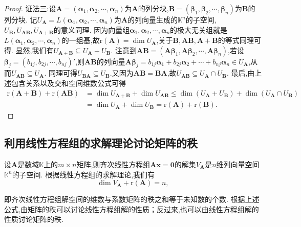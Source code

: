 \documentclass[lang=cn,newtx,10pt,scheme=chinese]{elegantbook}
\begin{document}
\begin{proof}
{\color{blue}证法三:}设\(\boldsymbol{A}=(\boldsymbol{\alpha}_1,\boldsymbol{\alpha}_2,\cdots,\boldsymbol{\alpha}_n)\)为\(\boldsymbol{A}\)的列分块,\(\boldsymbol{B}=(\boldsymbol{\beta}_1,\boldsymbol{\beta}_2,\cdots,\boldsymbol{\beta}_n)\)为\(\boldsymbol{B}\)的列分块. 记\(U_{\boldsymbol{A}} = L(\boldsymbol{\alpha}_1,\boldsymbol{\alpha}_2,\cdots,\boldsymbol{\alpha}_n)\)为\(\boldsymbol{A}\)的列向量生成的\(\mathbb{K}^n\)的子空间,\(U_{\boldsymbol{B}},U_{\boldsymbol{A}\boldsymbol{B}},U_{\boldsymbol{A}+\boldsymbol{B}}\)的意义同理. 因为向量组\(\boldsymbol{\alpha}_1,\boldsymbol{\alpha}_2,\cdots,\boldsymbol{\alpha}_n\)的极大无关组就是\(L(\boldsymbol{\alpha}_1,\boldsymbol{\alpha}_2,\cdots,\boldsymbol{\alpha}_n)\)的一组基,故\(\mathrm{r}(\boldsymbol{A})=\dim U_{\boldsymbol{A}}\),关于\(\boldsymbol{B},\boldsymbol{A}\boldsymbol{B},\boldsymbol{A}+\boldsymbol{B}\)的等式同理可得. 显然,我们有\(U_{\boldsymbol{A}+\boldsymbol{B}}\subseteq U_{\boldsymbol{A}}+U_{\boldsymbol{B}}\). 注意到\(\boldsymbol{A}\boldsymbol{B}=(\boldsymbol{A}\boldsymbol{\beta}_1,\boldsymbol{A}\boldsymbol{\beta}_2,\cdots,\boldsymbol{A}\boldsymbol{\beta}_n)\),若设\(\boldsymbol{\beta}_j=(b_{1j},b_{2j},\cdots,b_{nj})'\),则\(\boldsymbol{A}\boldsymbol{B}\)的列向量\(\boldsymbol{A}\boldsymbol{\beta}_j=b_{1j}\boldsymbol{\alpha}_1 + b_{2j}\boldsymbol{\alpha}_2+\cdots + b_{nj}\boldsymbol{\alpha}_n\in U_{\boldsymbol{A}}\),从而\(U_{\boldsymbol{A}\boldsymbol{B}}\subseteq U_{\boldsymbol{A}}\). 同理可得\(U_{\boldsymbol{B}\boldsymbol{A}}\subseteq U_{\boldsymbol{B}}\).又因为\(\boldsymbol{A}\boldsymbol{B}=\boldsymbol{B}\boldsymbol{A}\),故\(U_{\boldsymbol{A}\boldsymbol{B}}\subseteq U_{\boldsymbol{A}}\cap U_{\boldsymbol{B}}\). 最后,由上述包含关系以及交和空间维数公式可得
\begin{align*}
\mathrm{r}(\boldsymbol{A}+\boldsymbol{B})+\mathrm{r}(\boldsymbol{A}\boldsymbol{B})&=\dim U_{\boldsymbol{A}+\boldsymbol{B}}+\dim U_{\boldsymbol{A}\boldsymbol{B}}\leq\dim(U_{\boldsymbol{A}}+U_{\boldsymbol{B}})+\dim(U_{\boldsymbol{A}}\cap U_{\boldsymbol{B}})\\
&=\dim U_{\boldsymbol{A}}+\dim U_{\boldsymbol{B}}=\mathrm{r}(\boldsymbol{A})+\mathrm{r}(\boldsymbol{B}).
\end{align*}
\end{proof}

\subsection{利用线性方程组的求解理论讨论矩阵的秩}

\begin{theorem}\label{theorem:系数矩阵的秩与解空间的维数}
    设\(\boldsymbol{A}\)是数域\(\mathbb{K}\)上的\(m\times n\)矩阵,则齐次线性方程组\(\boldsymbol{A}\boldsymbol{x}=\boldsymbol{0}\)的解集\(V_{\boldsymbol{A}}\)是\(n\)维列向量空间\(\mathbb{K}^n\)的子空间. 根据线性方程组的求解理论,我们有
\[
\dim V_{\boldsymbol{A}}+\mathrm{r}(\boldsymbol{A}) = n,
\]
\end{theorem}
\begin{note}
    即齐次线性方程组解空间的维数与系数矩阵的秩之和等于未知数的个数. 根据上述公式,由矩阵的秩可以讨论线性方程组解的性质；反过来,也可以由线性方程组解的性质讨论矩阵的秩. 
\end{note}
\end{document}
